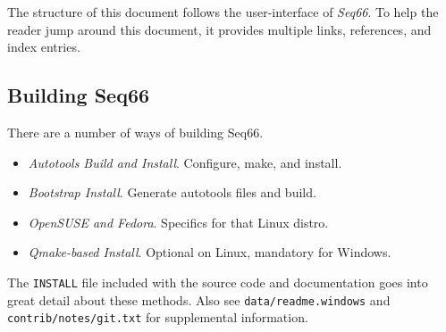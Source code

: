 \documentclass[
 11pt,
 twoside,
 a4paper,
 final                                 %
]{article}
\begin{document}
   The structure of this document follows the user-interface of
   \textsl{Seq66}.
   To help the reader jump around this document, it provides
   multiple links, references, and index entries.

\subsection{Building Seq66}
\label{subsec:introduction_building_seq66}

   There are a number of ways of building Seq66.

   \begin{itemize}
      \item \textsl{Autotools Build and Install}. Configure, make, and install.
      \item \textsl{Bootstrap Install}. Generate autotools files and build.
      \item \textsl{OpenSUSE and Fedora}. Specifics for that Linux distro.
      \item \textsl{Qmake-based Install}. Optional on Linux, mandatory for Windows.
   \end{itemize}

   The \texttt{INSTALL} file included with the source code and
   documentation goes into great detail about these methods.
   Also see \texttt{data/readme.windows} and \texttt{contrib/notes/git.txt}
   for supplemental information.




























\end{document}
